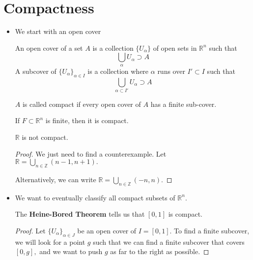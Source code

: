 \section{Compactness}
\begin{itemize}
    \item We start with an open cover
          \begin{definition}
              An open cover of a set $A$ is a collection $\{U_\alpha\}$ of open sets in $\mathbb{R}^n$ such that
              \begin{equation}
                  \bigcup_\alpha U_\alpha \supset A
              \end{equation}
              A subcover of $\{U_\alpha\}_{\alpha \in I}$ is a collection where $\alpha$ runs over $I' \subset I$ such that
              \begin{equation}
                  \bigcup_{\alpha \subset I'} U_\alpha \supset A
              \end{equation}
          \end{definition}
          \begin{definition}
              $A$ is called compact if every open cover of $A$ has a finite sub-cover.
          \end{definition}
          \begin{example}
              If $F \subset \mathbb{R}^n$ is finite, then it is compact.
          \end{example}
          \begin{example}
              $\mathbb{R}$ is not compact.
              \begin{proof}
                  We just need to find a counterexample. Let $\mathbb{R} = \bigcup_{n\in \mathbb{Z}} (n-1,n+1).$
                  \vspace{2mm}

                  Alternatively, we can write $\mathbb{R} = \bigcup_{n\in \mathbb{Z}} (-n,n).$
              \end{proof}
          \end{example}
    \item We want to eventually classify all compact subsets of $\mathbb{R}^n$.
          \begin{theorem}
              The \textbf{Heine-Bored Theorem} tells us that $[0,1]$ is compact.
          \end{theorem}
          \begin{proof}
              Let $\{U_\alpha\}_{\alpha \in J}$ be an open cover of $I=[0,1].$ To find a finite subcover, we will look for a point $g$ such that we can find a finite subcover that covers $[0,g],$ and we want to push $g$ as far to the right as possible.
              \vspace{2mm}


\end{proof}
\end{itemize}
